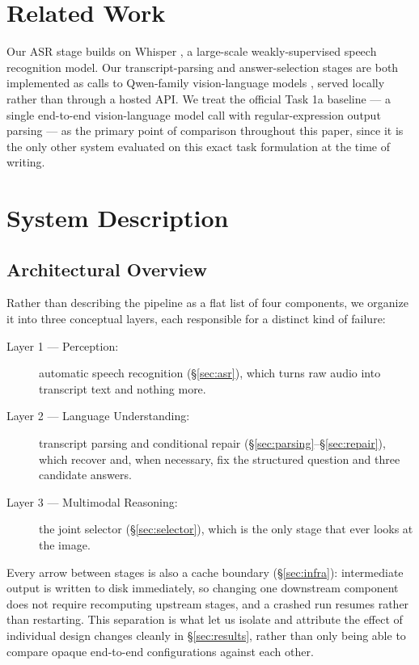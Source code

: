 \documentclass[11pt]{article}
\begin{document}
\section{Related Work}
\label{sec:related}

Our ASR stage builds on Whisper \citep{radford2023whisper}, a large-scale weakly-supervised speech recognition model. Our transcript-parsing and answer-selection stages are both implemented as calls to Qwen-family vision-language models \citep{bai2023qwenvl, bai2025qwen25vl}, served locally rather than through a hosted API. We treat the official Task 1a baseline --- a single end-to-end vision-language model call with regular-expression output parsing --- as the primary point of comparison throughout this paper, since it is the only other system evaluated on this exact task formulation at the time of writing.

\section{System Description}
\label{sec:system}

\subsection{Architectural Overview}
\label{sec:overview}

Rather than describing the pipeline as a flat list of four components, we organize it into three conceptual layers, each responsible for a distinct kind of failure:
\begin{description}
  \item[Layer 1 --- Perception:] automatic speech recognition (\S\ref{sec:asr}), which turns raw audio into transcript text and nothing more.
  \item[Layer 2 --- Language Understanding:] transcript parsing and conditional repair (\S\ref{sec:parsing}--\S\ref{sec:repair}), which recover and, when necessary, fix the structured question and three candidate answers.
  \item[Layer 3 --- Multimodal Reasoning:] the joint selector (\S\ref{sec:selector}), which is the only stage that ever looks at the image.
\end{description}
Every arrow between stages is also a cache boundary (\S\ref{sec:infra}): intermediate output is written to disk immediately, so changing one downstream component does not require recomputing upstream stages, and a crashed run resumes rather than restarting. This separation is what let us isolate and attribute the effect of individual design changes cleanly in \S\ref{sec:results}, rather than only being able to compare opaque end-to-end configurations against each other.
\end{document}
